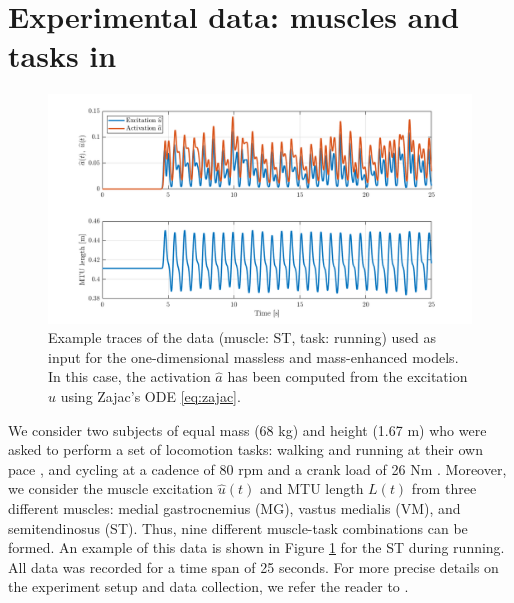 \documentclass{sfuthesis}
\numberwithin{equation}{chapter}
\numberwithin{figure}{chapter}
\numberwithin{table}{chapter}
\theoremstyle{definition}
\begin{document}
\section{Experimental data: muscles and tasks in} \label{sec:experimental_data}

\begin{figure}
    \centering
    \includegraphics[width=\textwidth]{example-traces-activation-mtulength.png}
    \caption{Example traces of the data (muscle: ST, task: running) used as input for the one-dimensional massless and mass-enhanced models. In this case, the activation $\widehat{a}$ has been computed from the excitation $\widehat{u}$ using Zajac's ODE \eqref{eq:zajac}.}
    \label{fig:traces_act_mtu_length}
\end{figure}

We consider two subjects of equal mass (68 kg) and height (1.67 m) who were asked to perform a set of locomotion tasks: walking and running at their own pace \cite{EvanThesis}, and cycling at a cadence of 80 rpm and a crank load of 26 Nm \cite{Dick2016}. Moreover, we consider the muscle excitation $\widehat{u}(t)$ and MTU length $L(t)$ from three different muscles: medial gastrocnemius (MG), vastus medialis (VM), and semitendinosus (ST). Thus, nine different muscle-task combinations can be formed. An example of this data is shown in Figure \ref{fig:traces_act_mtu_length} for the ST during running. All data was recorded for a time span of 25 seconds. For more precise details on the experiment setup and data collection, we refer the reader to \cite{EvanThesis}.

\end{document}
